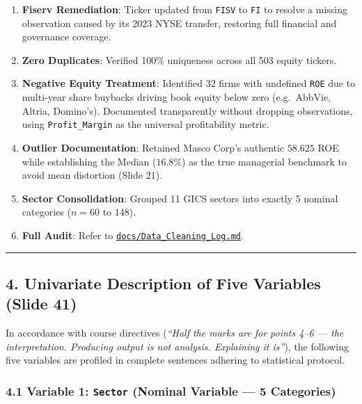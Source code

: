 \documentclass[
]{article}
\providecommand{\tightlist}{%
  \setlength{\itemsep}{0pt}\setlength{\parskip}{0pt}}
\begin{document}
\begin{enumerate}
\def\labelenumi{\arabic{enumi}.}
\tightlist
\item
  \textbf{Fiserv Remediation}: Ticker updated from \texttt{FISV} to
  \texttt{FI} to resolve a missing observation caused by its 2023 NYSE
  transfer, restoring full financial and governance coverage.
\item
  \textbf{Zero Duplicates}: Verified 100\% uniqueness across all 503
  equity tickers.
\item
  \textbf{Negative Equity Treatment}: Identified 32 firms with undefined
  \texttt{ROE} due to multi-year share buybacks driving book equity
  below zero (e.g.~AbbVie, Altria, Domino's). Documented transparently
  without dropping observations, using \texttt{Profit\_Margin} as the
  universal profitability metric.
\item
  \textbf{Outlier Documentation}: Retained Masco Corp's authentic
  \(58.625\) ROE while establishing the Median (\(16.8\%\)) as the true
  managerial benchmark to avoid mean distortion (Slide 21).
\item
  \textbf{Sector Consolidation}: Grouped 11 GICS sectors into exactly 5
  nominal categories (\(n = 60\) to \(148\)).
\item
  \textbf{Full Audit}: Refer to
  \href{file:///Users/david/Library/Mobile\%20Documents/com~apple~CloudDocs/Etudes\%20Supp/EMN\%20M1\%20/M1\%20-\%20S7/Data\%20Analysis\%20Quantitative/Group\%20Work\%20S&P\%20500/docs/Data_Cleaning_Log.md}{\texttt{docs/Data\_Cleaning\_Log.md}}.
\end{enumerate}

\begin{center}\rule{0.5\linewidth}{0.5pt}\end{center}

\subsection{4. Univariate Description of Five Variables (Slide
41)}\label{univariate-description-of-five-variables-slide-41}

In accordance with course directives (\emph{``Half the marks are for
points 4--6 --- the interpretation. Producing output is not analysis.
Explaining it is''}), the following five variables are profiled in
complete sentences adhering to statistical protocol.

\subsubsection{\texorpdfstring{4.1 Variable 1: \texttt{Sector} (Nominal
Variable --- 5
Categories)}{4.1 Variable 1: Sector (Nominal Variable --- 5 Categories)}}\label{variable-1-sector-nominal-variable-5-categories}
\end{document}
